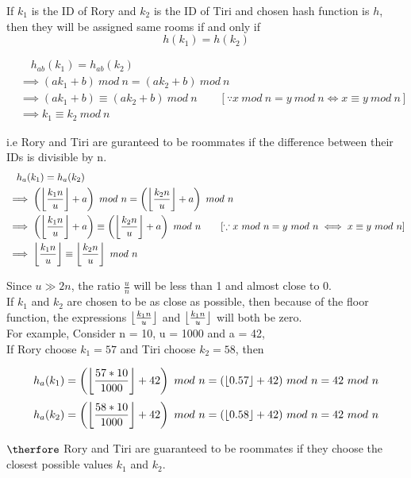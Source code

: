 \documentclass[12pt,twoside]{article}
\begin{document}
\begin{problems}
\problem  %
If $k_1$ is the ID of Rory and $k_2$ is the ID of Tiri and chosen hash function is $h$, then they will be assigned same rooms if and only if \\
\[h(k_1) = h(k_2) \]

\begin{problemparts}
\problempart %
\begin{align*}
    & \quad h_{ab}(k_1) = h_{ab}(k_2) \\
    &\implies (ak_1 + b)\ mod\ n = (ak_2 + b)\ mod\ n \\
    &\implies (ak_1 + b) \equiv (ak_2 + b)\ mod\ n  \quad \quad [\because x\ mod\ n = y\ mod\ n \iff x \equiv y\ mod\ n] \\
    &\implies k_1 \equiv k_2\ mod\ n
\end{align*}

i.e Rory and Tiri are guranteed to be roommates if the difference between their IDs is divisible by n.
\problempart %
\begin{align*}
    & \quad h_a(k_1) = h_a(k_2) \\
    &\implies \left(\left\lfloor \frac{k_1 n}{u} \right\rfloor + a \right)\ mod\ n = \left(\left\lfloor \frac{k_2 n}{u} \right\rfloor + a \right)\ mod\ n\\
    &\implies \left(\left\lfloor \frac{k_1 n}{u} \right\rfloor + a \right) \equiv \left(\left\lfloor \frac{k_2 n}{u} \right\rfloor + a \right)\ mod\ n \quad \quad [\because x\ mod\ n = y\ mod\ n \iff x \equiv y\ mod\ n] \\
    &\implies \left\lfloor \frac{k_1 n}{u} \right\rfloor \equiv \left\lfloor \frac{k_2 n}{u} \right\rfloor\ mod\ n \\
\end{align*}

Since $u \gg 2n$, the ratio $\frac{u}{n}$ will be less than 1 and almost close to 0. \\
If $k_1$ and $k_2$ are chosen to be as close as possible, then because of the floor function, the expressions $\left\lfloor \frac{k_1 n}{u} \right\rfloor$ and $\left\lfloor \frac{k_1 n}{u} \right\rfloor$ will both be zero. \\

For example, Consider n = 10, u = 1000 and a = 42, \\
If Rory choose $k_1 = 57$ and Tiri choose $k_2 = 58$, then

\[h_a(k_1) = \left(\floor{\frac{57 * 10}{1000}} + 42\right)\ mod\ n = (\floor{0.57} + 42)\ mod\ n = 42\ mod\ n\]
\[h_a(k_2) = \left(\floor{\frac{58 * 10}{1000}} + 42\right)\ mod\ n = (\floor{0.58} + 42)\ mod\ n = 42\ mod\ n\]

$\therfore$ Rory and Tiri are guaranteed to be roommates if they choose the closest possible values $k_1$ and $k_2$.


\end{problemparts}
\end{problems}
\end{document}

